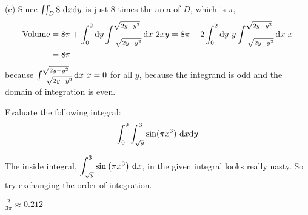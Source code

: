 \begin{solution}
(c) Since $\dblInt_D 8\ \dee{x}\dee{y}$ is just $8$ times the area of $D$,
which is $\pi$,
\begin{align*}
\text{Volume}&=8\pi+\int_0^2 \dee{y}\int_{-\sqrt{2y-y^2}}^{\sqrt{2y-y^2}}\dee{x}\ 2xy
=8\pi+2\int_0^2 \dee{y}\ y\int_{-\sqrt{2y-y^2}}^{\sqrt{2y-y^2}}\dee{x}\ x \\
&=8\pi
\end{align*}
because $\int_{-\sqrt{2y-y^2}}^{\sqrt{2y-y^2}}\dee{x}\ x=0$ for all $y$,
because the integrand is odd and the domain of integration is even.
\end{solution}

\begin{question}[M200 2001D] %
Evaluate the following integral:
\begin{equation*}
\int_0^9\int_{\sqrt{y}}^3\sin(\pi x^3)\ \dee{x}\dee{y}
\end{equation*}
\end{question}

\begin{hint}
The inside integral, $\dst\int_{\sqrt{y}}^3\sin\big(\pi x^3\big)\ \dee{x}$,
in the given integral looks really nasty.  So try exchanging
the order of integration.
\end{hint}

\begin{answer}
$\frac{2}{3\pi}\approx 0.212$
\end{answer}

